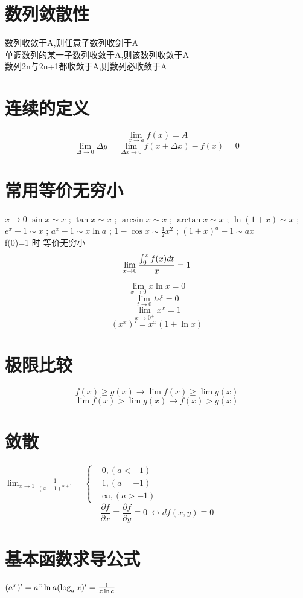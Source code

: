 \documentclass[UTF8]{ctexart}
\begin{document}
\section{数列敛散性}
数列收敛于A,则任意子数列收剑于A   \\
单调数列的某一子数列收敛于A,则该数列收敛于A \\
数列{2n}与{2n+1}都收敛于A,则数列必收敛于A

\section{连续的定义}
$$ \lim_{x\rightarrow a}f(x)=A$$
$$ \lim_{\Delta\rightarrow0}\Delta y=\lim_{\Delta x \rightarrow 0 } f(x+ \Delta x) - f(x)=0$$

\section{常用等价无穷小}
 $ x \rightarrow 0$
$ \sin x \sim x$ ; $ \tan x \sim x$ ; $ \arcsin x \sim x$ ; $ \arctan x \sim x$ ; $ \ln({1+x}) \sim x $ ; $ e^x -1 \sim x$ ; $ a^x -1 \sim x \ln a $ ; $ 1-\cos x \sim \frac{1}{2} x^2 $ ; $ {(1+x)}^a -1 \sim ax$ \\

f(0)=1 时 等价无穷小 \\
$$ \lim_{x \rightarrow 0 } {{\int_0^x f(x)dt} \over {x}} =1$$

$$ \lim_{x \rightarrow 0} x \ln x =0$$
$$\lim_{t \rightarrow 0} t e^t =0 $$
$$\lim _{x \rightarrow 0^+} x^x =1$$
$$(x^x)'=x^x(1+ \ln x)$$

\section{极限比较}
$$ f(x) \geq g(x) \rightarrow \lim f(x) \geq \lim g(x) $$
$$ \lim f(x) > \lim g(x) \rightarrow f(x) > g(x) $$
\section{敛散}
$ \lim_{x \rightarrow 1} \frac{1}{(x-1)^{α+1}}=
  \begin{cases}
  &0 , (a<-1) \\
  &1 , (a=-1) \\
  &\infty ,(a>-1)
\end{cases}
$
$$ \frac{\partial f}{\partial x} \equiv \frac{\partial f}{\partial y} \equiv 0\ \leftrightarrow df({x,y}) \equiv 0 $$

\section{基本函数求导公式}
$ (a^x)'=a^x \ln a \\
  ( \log _a x)'=\frac{1}{x \ln a} $
\end{document}
